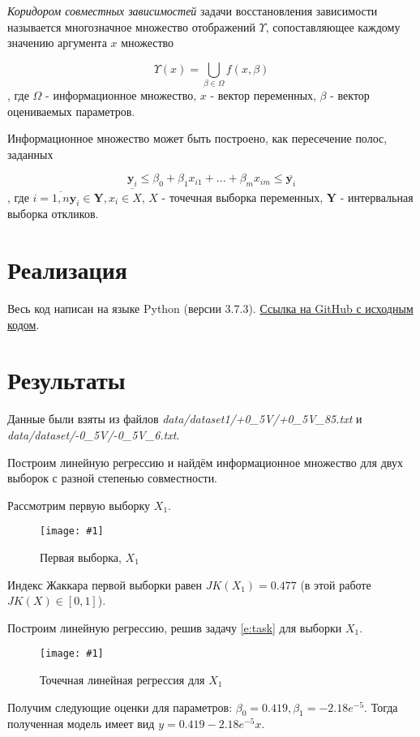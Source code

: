 \documentclass[a4paper,12pt]{article}
\newcommand{\plot}[3]{
    \begin{figure}[H]
        \begin{center}
            \texttt{[image: \#1]}
            \caption{#2}
            \label{#3}
        \end{center}
    \end{figure}
}
\begin{document}
    \textsl{Коридором совместных зависимостей} задачи восстановления зависимости
    называется многозначное множество отображений $ \Upsilon $, сопоставляющее
    каждому значению аргумента $ x $ множество
    
    \begin{equation}
        \Upsilon(x) = \bigcup_{\beta \in \Omega} f(x, \beta)
    \end{equation}
    , где $ \Omega $ - информационное множество, $ x $ - вектор переменных, $ \beta $ - вектор оцениваемых параметров. 

    Информационное множество может быть построено, как пересечение полос, заданных
    
    \begin{equation}
        \underline{\textbf{y}_i} \leq \beta_0 + \beta_1 x_{i1} + ... + \beta_m x_{im} \leq \overline{\textbf{y}_i}
    \end{equation}
    , где $ i = \overline{1, n} \textbf{y}_i \in \textbf{Y}, x_i \in X $, $ X $ - точечная выборка переменных,
    $ \textbf{Y} $ - интервальная выборка откликов.

    \section{Реализация}
    \quad Весь код написан на языке Python (версии 3.7.3).
    \href{https://github.com/kirillkuks/Intervals/tree/master/lab2}{Ссылка на GitHub с исходным кодом}.

    \section{Результаты}
    \quad Данные были взяты из файлов \textsl{data/dataset1/+0\_5V/+0\_5V\_85.txt} и \textsl{data/dataset/-0\_5V/-0\_5V\_6.txt}.

    Построим линейную регрессию и найдём информационное множество для двух выборок
    с разной степенью совместности.

    Рассмотрим первую выборку $ X_1 $.
    \plot{X1}{Первая выборка, $ X_1 $}{p:sampleX1}

    Индекс Жаккара первой выборки равен $ JK(X_1) = 0.477 $ (в этой работе $ JK(X) \in [0, 1] $).

    Построим линейную регрессию, решив задачу \ref{e:task} для выборки $ X_1 $.
    \plot{PointRegressionX1}{Точечная линейная регрессия для $ X_1 $}{p:regressionX1}
    
    Получим следующие оценки для параметров: $ \beta_0 = 0.419, \beta_1 = -2.18e^{-5} $.
    Тогда полученная модель имеет вид $ y = 0.419 - 2.18e^{-5} x $.
\end{document}
